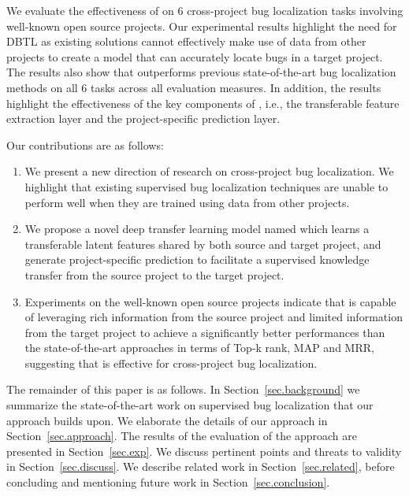 
We evaluate the effectiveness of \TRANPCNN on 6 cross-project bug localization tasks involving well-known open source projects. Our experimental results highlight the need for DBTL as existing solutions cannot effectively make use of data from other projects to create a model that can accurately locate bugs in a target project. The results also show that \TRANPCNN outperforms previous state-of-the-art bug localization methods on all 6 tasks across all evaluation measures. In addition, the results highlight the effectiveness of the key components of \TRANPCNN, i.e., the transferable feature extraction layer and the project-specific prediction layer.

Our contributions are as follows:

\begin{enumerate}

\item We present a new direction of research on cross-project bug localization. We highlight that existing supervised bug localization techniques are unable to perform well when they are trained using data from other projects. 
    
\item We propose a novel deep transfer learning model named \TRANPCNN which learns a transferable latent features shared by both source and target project, and generate project-specific prediction to facilitate a supervised knowledge transfer from the source project to the target project.



\item Experiments on the well-known open source projects indicate that \TRANPCNN is capable of leveraging rich information from the source project and limited information from the target project to achieve a significantly better performances than the state-of-the-art approaches in terms of Top-k rank, MAP and MRR, suggesting that \TRANPCNN is effective for cross-project bug localization.


\end{enumerate}

The remainder of this paper is as follows. In Section~\ref{sec.background} we summarize the state-of-the-art work on supervised bug localization that our approach builds upon. We elaborate the details of our approach in Section~\ref{sec.approach}. The results of the evaluation of the approach are presented in Section~\ref{sec.exp}. We discuss pertinent points and threats to validity in Section~\ref{sec.discuss}. We describe related work in Section~\ref{sec.related}, before concluding and mentioning future work in Section~\ref{sec.conclusion}. 

